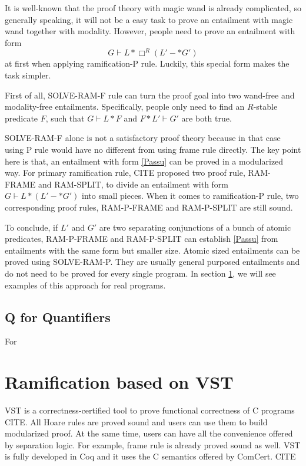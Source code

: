 It is well-known that the proof theory with magic wand is already complicated, so generally speaking, it will not be a easy task to prove an entailment with magic wand together with modality. However, people need to prove an entailment with form
\begin{equation}G \vdash  L * \Box^R (L' -* G') \label{eqn:Passu} \end{equation}
at first when applying ramification-P rule. Luckily, this special form makes the task simpler.

First of all, SOLVE-RAM-F rule can turn the proof goal into two wand-free and modality-free entailments. Specifically, people only need to find an $R$-stable predicate $F$, such that $G \vdash L * F$ and $F * L' \vdash G'$ are both true. 

SOLVE-RAM-F alone is not a satisfactory proof theory because in that case using P rule would have no different from using frame rule directly. The key point here is that, an entailment with form \ref{Passu} can be proved in a modularized way. For primary ramification rule, CITE proposed two proof rule, RAM-FRAME and RAM-SPLIT, to divide an entailment with form $G \vdash L * (L' -* G')$ into small pieces. When it comes to ramification-P rule, two corresponding proof rules, RAM-P-FRAME and RAM-P-SPLIT are still sound.

To conclude, if $L'$ and $G'$ are two separating conjunctions of a bunch of atomic predicates, RAM-P-FRAME and RAM-P-SPLIT can establish \ref{Passu} from entailments with the same form but smaller size. Atomic sized entailments can be proved using SOLVE-RAM-P. They are usually general purposed entailments and do not need to be proved for every single program. In section \ref{vst}, we will see examples of this approach for real programs.

\subsection{Q for Quantifiers}

For

\section{Ramification based on VST}\label{vst}


VST is a correctness-certified tool to prove functional correctness of C programs CITE. All Hoare rules are proved sound and users can use them to build modularized proof. At the same time, users can have all the convenience offered by separation logic. For example, frame rule is already proved sound as well. VST is fully developed in Coq and it uses the C semantics offered by ComCert. CITE

